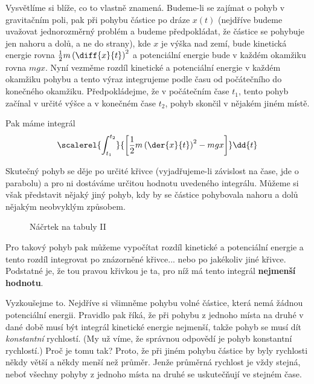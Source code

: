     Vysvětlíme si blíže, co to vlastně znamená. Budeme-li se zajímat o pohyb v gravitačním poli, pak
    při pohybu částice po dráze \(x(t)\) (nejdříve budeme uvažovat jednorozměrný problém a budeme
    předpokládat, že částice se pohybuje jen nahoru a dolů, a ne do strany), kde \(x\) je výška nad
    zemí, bude kinetická energie rovna \(\frac{1}{2}m\left(\diff{x}{t}\right)^2\) a potenciální
    energie bude v každém okamžiku rovna \(mgx\). Nyní vezměme rozdíl kinetické a potenciální
    energie v každém okamžiku pohybu a tento výraz integrujeme podle času od počátečního do
    konečného okamžiku. Předpokládejme, že v počátečním čase \(t_1\), tento pohyb začínal v určité
    výšce a v konečném čase \(t_2\), pohyb skončil v nějakém jiném místě. 

    Pak máme integrál
    \begin{equation*}
      \scalerel{\int_{t_1}^{t_2}}{\left[\frac{1}{2}m\left(\der{x}{t}\right)^2 - mgx\right]}\dd{t}
    \end{equation*}

    Skutečný pohyb se děje po určité křivce (vyjadřujeme-li závislost na čase, jde o parabolu) a pro
    ni dostáváme určitou hodnotu uvedeného integrálu. Můžeme si však představit nějaký jiný pohyb,
    kdy by se částice pohybovala nahoru a dolů nějakým neobvyklým způsobem.

    \begin{figure}[ht!]
      \centering
        \hfill
      \caption{Náčrtek na tabuly II}
      \label{fyz:fig653}
    \end{figure}
    
    Pro takový pohyb pak můžeme vypočítat rozdíl kinetické a potenciální energie a tento rozdíl
    integrovat po znázorněné křivce... nebo po jakékoliv jiné křivce. Podstatné je, že tou pravou
    křivkou je ta, pro níž má tento integrál \textbf{nejmenší hodnotu}.

    Vyzkoušejme to. Nejdříve si všimněme pohybu volné částice, která nemá žádnou potenciální
    energii. Pravidlo pak říká, že při pohybu z jednoho místa na druhé v dané době musí být integrál
    kinetické energie nejmenší, takže pohyb se musí dít \emph{konstantní} rychlostí. (My už víme, že
    správnou odpovědí je pohyb konstantní rychlostí.) Proč je tomu tak? Proto, že při jiném pohybu
    částice by byly rychlosti někdy větší a někdy menší než průměr. Jenže průměrná rychlost je vždy
    stejná, neboť všechny pohyby z jednoho místa na druhé se uskutečňují ve stejném čase.

